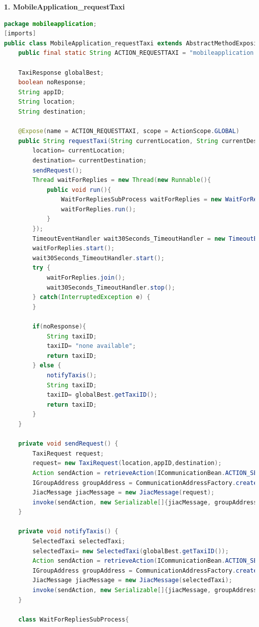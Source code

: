 \textbf{1. MobileApplication\_requestTaxi}\\

\begin{lstlisting}[language=java, caption= Generated Agent Bean - MobileApplication\_requestTaxi]
package mobileapplication;
[imports]
public class MobileApplication_requestTaxi extends AbstractMethodExposingBean{
	public final static String ACTION_REQUESTTAXI = "mobileapplication.MobileApplication_requestTaxi#requestTaxi"; 
	
	TaxiResponse globalBest;
	boolean noResponse;
	String appID;
	String location;
	String destination;
	
	@Expose(name = ACTION_REQUESTTAXI, scope = ActionScope.GLOBAL)
	public String requestTaxi(String currentLocation, String currentDestination) {
		location= currentLocation;
		destination= currentDestination;
		sendRequest();
		Thread waitForReplies = new Thread(new Runnable(){
			public void run(){
				WaitForRepliesSubProcess waitForReplies = new WaitForRepliesSubProcess();
				waitForReplies.run();
			}
		});
		TimeoutEventHandler wait30Seconds_TimeoutHandler = new TimeoutEventHandler(30000,waitForReplies);
		waitForReplies.start();
		wait30Seconds_TimeoutHandler.start();
		try {
			waitForReplies.join();
			wait30Seconds_TimeoutHandler.stop();
		} catch(InterruptedException e) {
		}
		
		if(noResponse){
			String taxiID;
			taxiID= "none available";
			return taxiID;
		} else {
			notifyTaxis();
			String taxiID;
			taxiID= globalBest.getTaxiID();
			return taxiID;
		}
	}

	private void sendRequest() {
		TaxiRequest request;
		request= new TaxiRequest(location,appID,destination);
		Action sendAction = retrieveAction(ICommunicationBean.ACTION_SEND);
		IGroupAddress groupAddress = CommunicationAddressFactory.createGroupAddress("TaxiRequest");
		JiacMessage jiacMessage = new JiacMessage(request);
		invoke(sendAction, new Serializable[]{jiacMessage, groupAddress});
	}

	private void notifyTaxis() {
		SelectedTaxi selectedTaxi;
		selectedTaxi= new SelectedTaxi(globalBest.getTaxiID());
		Action sendAction = retrieveAction(ICommunicationBean.ACTION_SEND);
		IGroupAddress groupAddress = CommunicationAddressFactory.createGroupAddress("notification");
		JiacMessage jiacMessage = new JiacMessage(selectedTaxi);
		invoke(sendAction, new Serializable[]{jiacMessage, groupAddress});
	}

	class WaitForRepliesSubProcess{
		

\end{lstlisting}
